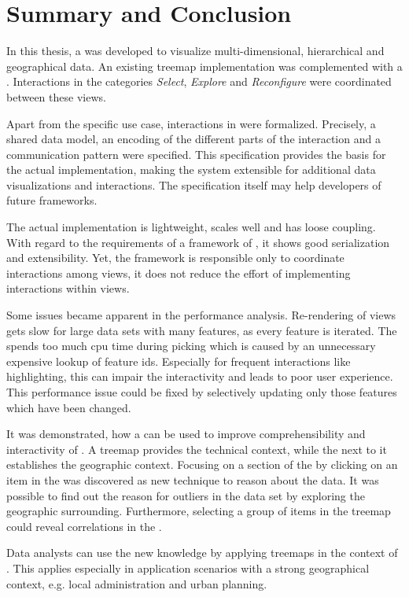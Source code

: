 \chapter{Summary and Conclusion}\label{sec:conclusion}

In this thesis, a \cmv{} was developed to visualize multi-dimensional, hierarchical and geographical data.
An existing treemap implementation was complemented with a \gv{}.
Interactions in the categories \emph{Select}, \emph{Explore} and \emph{Reconfigure} were coordinated between these views.

Apart from the specific use case, interactions in \cmvs{} were formalized.
Precisely, a shared data model, an encoding of the different parts of the interaction and a communication pattern were specified.
This specification provides the basis for the actual implementation, making the system extensible for additional data visualizations and interactions.
The specification itself may help developers of future \cmv{} frameworks.

The actual implementation is lightweight, scales well and has loose coupling.
With regard to the requirements of a framework of \cmvs{}, it shows good serialization and extensibility.
Yet, the framework is responsible only to coordinate interactions among views, it does not reduce the effort of implementing interactions within views.

Some issues became apparent in the performance analysis.
Re-rendering of views gets slow for large data sets with many features, as every feature is iterated.
The \tmap{} spends too much \gls{cpu} time during picking which is caused by an unnecessary expensive lookup of feature ids.
Especially for frequent interactions like highlighting, this can impair the interactivity and leads to poor user experience.
This performance issue could be fixed by selectively updating only those features which have been changed.

It was demonstrated, how a \cmv{} can be used to improve comprehensibility and interactivity of \tmaps{}.
A treemap provides the technical context, while the \gv{} next to it establishes the geographic context.
Focusing on a section of the \gv{} by clicking on an item in the \tmap{} was discovered as new technique to reason about the data.
It was possible to find out the reason for outliers in the data set by exploring the geographic surrounding.
Furthermore, selecting a group of items in the treemap could reveal correlations in the \gv{}.

Data analysts can use the new knowledge by applying treemaps in the context of \dss{}.
This applies especially in application scenarios with a strong geographical context, e.g. local administration and urban planning.


